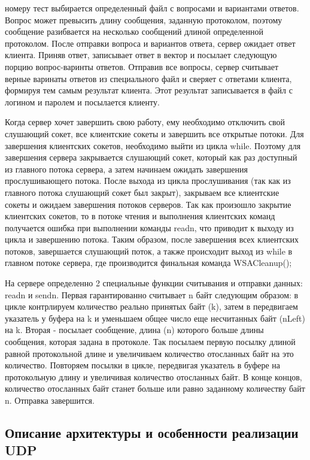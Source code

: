 номеру тест выбирается определенный файл с вопросами и вариантами ответов. Вопрос может превысить длину сообщения, заданную протоколом, поэтому сообщение разибвается на несколько сообщений длиной определенной протоколом. После отправки вопроса и вариантов ответа, сервер ожидает ответ клиента. Приняв ответ, записывает ответ в вектор и посылает следующую порцию вопрос-варинты ответов. Отправив все вопросы, сервер считывает верные варинаты ответов из специального файл и сверяет с ответами клиента, формируя тем самым результат клиента. Этот результат записывается в файл с логином и паролем и посылается клиенту.

Когда сервер хочет завершить свою работу, ему необходимо отключить свой слушающий сокет, все клиентские сокеты и завершить все открытые  потоки. Для завершения клиентских сокетов, необходимо выйти из цикла while. Поэтому для завершения сервера закрывается слушающий сокет, который как раз доступный из главного потока сервера, а затем начинаем ожидать завершения прослушивающего потока. После выхода из цикла прослушивания (так как из главного потока слушающий сокет был закрыт), закрываем все клиентские сокеты и ожидаем завершения потоков серверов. Так как произошло закрытие клиентских сокетов, то в потоке чтения и выполнения клиентских команд получается ошибка при выполнении команды readn, что приводит к выходу из цикла и завершению потока. Таким образом, после завершения всех клиентских потоков, завершается слушающий поток, а также происходит выход из while в главном потоке сервера, где производится финальная команда WSACleanup();
  
На сервере определенно 2 специальные функции считывания и отправки данных: readn и sendn.
Первая гарантированно считывает n байт следующим образом: в цикле контрлируем количество реально принятых байт (k), затем в передвигаем указатель у буфера на k и уменьшаем общее число еще несчитанных байт (nLeft) на k.
Вторая - посылает сообщение, длина (n) которого больше длины сообщения, которая задана в протоколе. Так посылаем первую посылку длиной равной протокольной длине и увеличиваем количество отосланных байт на это количество. Повторяем посылки в цикле, передвигая указатель в буфере на протокольную длину и увеличивая количество отосланных байт. В конце концов, количество отосланных байт станет больше или равно заданному количеству байт n. Отправка завершится.

\subsection{Описание архитектуры и особенности реализации UDP}

